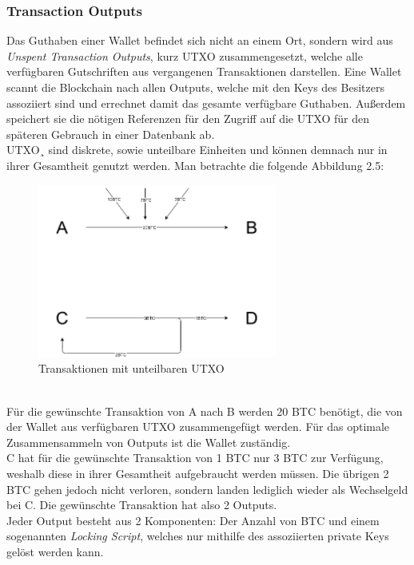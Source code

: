 \subsubsection{Transaction Outputs}
Das Guthaben einer Wallet befindet sich nicht an einem Ort, sondern wird aus \emph{Unspent Transaction Outputs}, kurz UTXO zusammengesetzt, welche alle verfügbaren Gutschriften aus vergangenen Transaktionen darstellen.
Eine Wallet scannt die Blockchain nach allen Outputs, welche mit den Keys des Besitzers assoziiert sind und errechnet damit das gesamte verfügbare Guthaben. Außerdem speichert sie die nötigen Referenzen für den Zugriff auf die UTXO für den späteren Gebrauch in einer Datenbank ab.\\
UTXO¸ sind diskrete, sowie unteilbare Einheiten und können demnach nur in ihrer Gesamtheit genutzt werden. Man betrachte die folgende Abbildung 2.5:
\begin{figure}[htpb]
	\centering
	\includegraphics[width=0.7\textwidth]{images/UTXO.png}
	\caption{Transaktionen mit unteilbaren UTXO}
	\label{6braun:fig:Transaktionen}
\end{figure}\\
Für die gewünschte Transaktion von A nach B werden 20 BTC benötigt, die von der Wallet aus verfügbaren UTXO zusammengefügt werden. 
Für das optimale Zusammensammeln von Outputs ist die Wallet zuständig.\\
C hat für die gewünschte Transaktion von 1 BTC nur 3 BTC zur Verfügung, weshalb diese in ihrer Gesamtheit aufgebraucht werden müssen.
Die übrigen 2 BTC gehen jedoch nicht verloren, sondern landen lediglich wieder als Wechselgeld bei C. 
Die gewünschte Transaktion hat also 2 Outputs.\\
Jeder Output besteht aus 2 Komponenten: Der Anzahl von BTC und einem sogenannten \emph{Locking Script}, welches nur mithilfe des assoziierten private Keys gelöst werden kann. 
